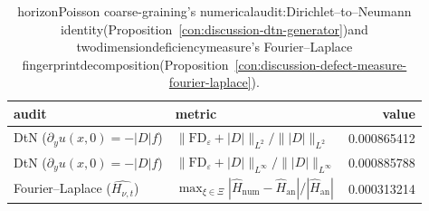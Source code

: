 \begin{table}[H]
\centering
\small
\begin{tabular}{l l r}
\toprule
audit & metric & value\\
\midrule
DtN ($\partial_y u(x,0)=-|D|f$) & $\|\mathrm{FD}_\varepsilon+|D|\|_{L^2}/\||D|\|_{L^2}$ & 0.000865412\\
DtN ($\partial_y u(x,0)=-|D|f$) & $\|\mathrm{FD}_\varepsilon+|D|\|_{L^\infty}/\||D|\|_{L^\infty}$ & 0.000885788\\
Fourier--Laplace ($\widehat{H_{\nu,t}}$) & $\max_{\xi\in\Xi}|\widehat{H}_{\mathrm{num}}-\widehat{H}_{\mathrm{an}}|/|\widehat{H}_{\mathrm{an}}|$ & 0.000313214\\
\bottomrule
\end{tabular}
\caption{horizonPoisson coarse-graining's numericalaudit:Dirichlet--to--Neumann identity(Proposition~\ref{con:discussion-dtn-generator})and twodimensiondeficiencymeasure's  Fourier--Laplace fingerprintdecomposition(Proposition~\ref{con:discussion-defect-measure-fourier-laplace}). }
\label{tab:xi-horizon-dtn-fourier-laplace-audit}
\end{table}
